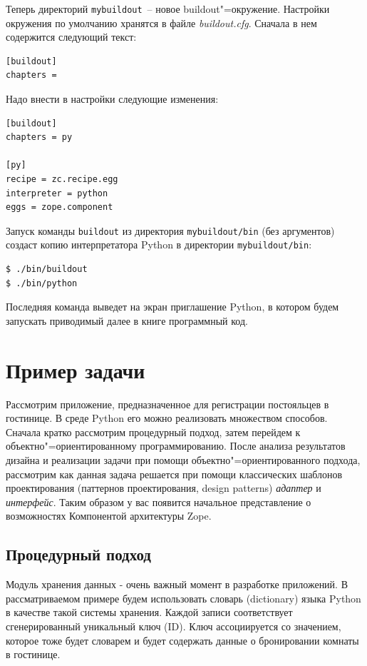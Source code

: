 \documentclass[a4paper,openany,twoside,draft]{book}
\providecommand*{\DUroletitlereference}[1]{\textsl{#1}}
\begin{document}
Теперь директорий \texttt{mybuildout}~-- новое buildout"=окружение.  Настройки окружения по умолчанию хранятся в файле \DUroletitlereference{buildout.cfg}.  Сначала в нем содержится следующий текст:

\begin{verbatim}
[buildout]
chapters =
\end{verbatim}

Надо внести в настройки следующие изменения:

\begin{verbatim}
[buildout]
chapters = py

[py]
recipe = zc.recipe.egg
interpreter = python
eggs = zope.component
\end{verbatim}

Запуск команды \texttt{buildout} из директория \texttt{mybuildout/bin} (без аргументов) создаст копию интерпретатора Python в директории \texttt{mybuildout/bin}:

\begin{verbatim}
$ ./bin/buildout
$ ./bin/python
\end{verbatim}

Последняя команда выведет на экран приглашение Python, в котором будем запускать приводимый далее в книге программный код.


\chapter{Пример задачи%
  \label{id17}%
}


Рассмотрим приложение, предназначенное для регистрации постояльцев в гостинице.  В среде Python его можно реализовать множеством способов.  Сначала кратко рассмотрим процедурный подход, затем перейдем к объектно"=ориентированному программированию.  После анализа результатов дизайна и реализации задачи при помощи объектно"=ориентированного подхода, рассмотрим как данная задача решается при помощи классических шаблонов проектирования (паттернов проектирования, design patterns) \DUroletitlereference{адаптер} и \DUroletitlereference{интерфейс}.  Таким образом у вас появится начальное представление о возможностях Компонентой архитектуры Zope.


\section{Процедурный подход%
  \label{id19}%
}

Модуль хранения данных - очень важный момент в разработке приложений.  В рассматриваемом примере будем использовать словарь (dictionary) языка Python в качестве такой системы хранения.  Каждой записи соответствует сгенерированный уникальный ключ (ID).  Ключ ассоциируется со значением, которое тоже будет словарем и будет содержать данные о бронировании комнаты в гостинице.
\end{document}
